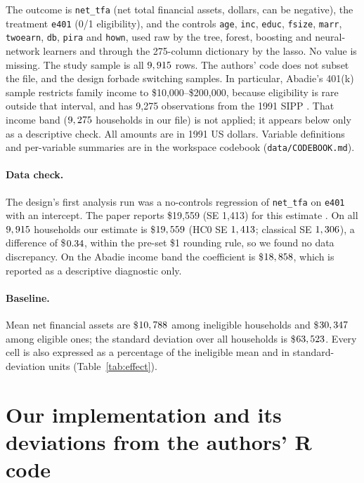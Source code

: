 \documentclass[11pt]{article}
\newcommand{\var}[1]{\texttt{#1}}
\begin{document}
The outcome is \var{net\_tfa} (net total financial assets, dollars, can be negative), the
treatment \var{e401} (0/1 eligibility), and the controls \var{age}, \var{inc},
\var{educ}, \var{fsize}, \var{marr}, \var{twoearn}, \var{db}, \var{pira} and
\var{hown}, used raw by the tree, forest, boosting and neural-network learners and
through the 275-column dictionary by the lasso. No value is missing. The study sample is
all $9,915$ rows. The authors' code does not subset the file, and the design forbade
switching samples. In particular, Abadie's 401(k) sample restricts family income to
\$10,000--\$200,000, because eligibility is rare outside that interval, and has 9,275
observations from the 1991 SIPP \citep{abadie2000}. That income band ($9,275$
households in our file) is not applied; it appears below only as a descriptive check.
All amounts are in 1991 US dollars. Variable definitions and per-variable summaries are
in the workspace codebook (\var{data/CODEBOOK.md}).

\paragraph{Data check.} The design's first analysis run was a no-controls regression of
\var{net\_tfa} on \var{e401} with an intercept. The paper reports \$19,559 (SE 1,413) for
this estimate \citep{chernozhukov2018dml}. On all $9,915$ households our estimate is
\$$19,559$ (HC0 SE $1,413$; classical SE $1,306$), a
difference of \$$0.34$, within the pre-set \$1 rounding rule, so we found no
data discrepancy. On the Abadie income band the coefficient is \$$18,858$,
which is reported as a descriptive diagnostic only.

\paragraph{Baseline.} Mean net financial assets are \$$10,788$ among
ineligible households and \$$30,347$ among eligible ones; the standard deviation
over all households is \$$63,523$. Every cell is also expressed as a percentage of
the ineligible mean and in standard-deviation units (Table~\ref{tab:effect}).

\section{Our implementation and its deviations from the authors' R code}
\label{sec:impl}
\end{document}
